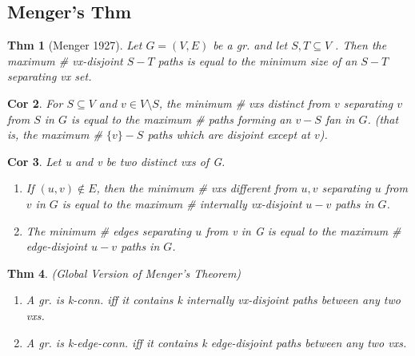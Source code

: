 \documentclass[11pt, fleqn, a4paper, landscape]{article}
\theoremstyle{plain} %
\newtheorem{thm}{Thm}
\newtheorem{cor}[thm]{Cor}
\theoremstyle{remark} %
\theoremstyle{definition} %
\newtheorem{defi}[thm]{Def}
\begin{document}
\begin{multicols}{5}
\subsection{Menger’s Thm}

%
\addtocounter{thm}{1}
\begin{thm}[Menger 1927]
Let $G = (V,E)$ be a gr. and let $S, T \subseteq V$ . Then the maximum
\# vx-disjoint $S-T$ paths is equal to the minimum size of an $S-T$ separating vx set.
\end{thm}

\begin{cor}
For $S \subseteq V$ and $v\in V \setminus S$, the minimum \# vxs distinct from $v$ separating $v$ from $S$ in $G$ is equal to the maximum \# paths forming an $v-S$ fan in $G$. (that is, the maximum \# $\{v\}-S$ paths which are disjoint except at $v$).
\end{cor}

\addtocounter{thm}{2}
\begin{cor}
Let u and v be two distinct vxs of G.
\begin{enumerate}
\item If $(u, v) \notin E$, then the minimum \# vxs different from $u, v$ separating $u$ from $v$ in $G$ is equal to the maximum \# internally vx-disjoint $u-v$ paths in $G$.
\item The minimum \# edges separating $u$ from v in G is equal to the maximum \# edge-disjoint $u-v$ paths in $G$.
\end{enumerate}
\end{cor}

\begin{thm}
(Global Version of Menger’s Theorem)
\begin{enumerate}
\item A gr. is k-conn. iff it contains k internally vx-disjoint paths between any
two vxs.
\item A gr. is k-edge-conn. iff it contains k edge-disjoint paths between any two
vxs.
\end{enumerate}
\end{thm}


\end{multicols}
\end{document}
